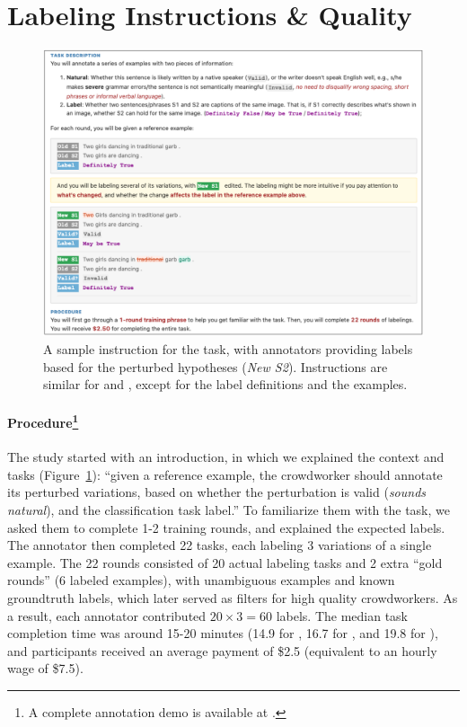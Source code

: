 \section{Labeling Instructions \& Quality}
\label{appendix:label_instruct}


\begin{figure}[h]
\centering
\includegraphics[width=1\textwidth]{figures/mturk_instruction.pdf}
\vspace{-15pt}
\caption{A sample instruction for the \nli task, with annotators providing labels based for the perturbed hypotheses (\emph{New S2}). Instructions are similar for \qqp and \sst, except for the label definitions and the examples. }
\vspace{-10pt}
\label{fig:mturk_instruction}
\end{figure}

\paragraph{Procedure\footnote{A complete annotation demo is available at \mturkurl.}}
The study started with an introduction, in which we explained the context and tasks (Figure~\ref{fig:mturk_instruction}): 
``given a reference example, the crowdworker should annotate its perturbed variations, based on whether the perturbation is valid (\emph{sounds natural}), and the classification task label.''
To familiarize them with the task, we asked them to complete 1-2 training rounds, and explained the expected labels.
The annotator then completed 22 tasks, each labeling 3 variations of a single example.
The 22 rounds consisted of 20 actual labeling tasks and 2 extra ``gold rounds'' (6 labeled examples), with unambiguous examples and known groundtruth labels, which later served as filters for high quality crowdworkers.
As a result, each annotator contributed $20 \times 3=60$ labels.
The median task completion time was around 15-20 minutes (14.9 for \qqp, 16.7 for \sst, and 19.8 for \nli), and participants received an average payment of \$2.5 (equivalent to an hourly wage of \$7.5).


